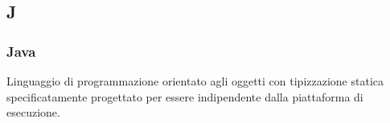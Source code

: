 \subsection*{\textbf{\hfill \Huge{J} \hfill}} 
\subsubsection*{Java}
Linguaggio di programmazione orientato agli oggetti con tipizzazione
statica specificatamente progettato per essere indipendente dalla piattaforma
di esecuzione.